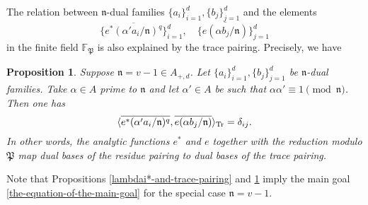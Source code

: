 \documentclass[11pt]{amsart}
\theoremstyle{plain}
\newtheorem{prop}[thm]{Proposition}
\theoremstyle{definition}
\theoremstyle{remark}
\numberwithin{equation}{section}
\newcommand{\FF}{\mathbb{F}}
\newcommand{\nfk}{\mathfrak{n}}
\newcommand{\Pfk}{\mathfrak{P}}
\newcommand{\ovl}{\overline}
\DeclarePairedDelimiter{\angtr}{\langle}{\rangle_\textnormal{Tr}}
\begin{document}
	The relation between $\nfk$-dual families $\{a_i\}_{i=1}^{d}, \{b_j\}_{j=1}^{d}$ and the elements
	$$
	\{\ovl{e^*(\alpha' a_i/\nfk)^q}\}_{i=1}^{d}, 
	\quad
	\{\ovl{e(\alpha b_j/\nfk)}\}_{j=1}^{d}
	$$
	in the finite field $\FF_\Pfk$ is also explained by the trace pairing.
	Precisely, we have
	
	\begin{prop}    \label{residue-and-trace}
		Suppose $\nfk = v - 1 \in A_{+,d}$.
		Let $\{a_i\}_{i=1}^{d}, \{b_j\}_{j=1}^{d}$ be $\nfk$-dual families.
		Take $\alpha \in A$ prime to $\nfk$ and let $\alpha' \in A$ be such that $\alpha\alpha' \equiv 1 \pmod{\nfk}$.
		Then one has
		$$
		\angtr{ \ovl{e^*(\alpha' a_i/\nfk)^q}, \ovl{e(\alpha b_j/\nfk)} }= \delta_{ij}.
		$$
		In other words, the analytic functions $e^*$ and $e$ together with the reduction modulo $\Pfk$ map dual bases of the residue pairing to dual bases of the trace pairing.
	\end{prop}
	
	Note that Propositions \ref{lambdai*-and-trace-pairing} and \ref{residue-and-trace} imply the main goal \eqref{the-equation-of-the-main-goal} for the special case $\nfk = v-1$.
	
\end{document}
